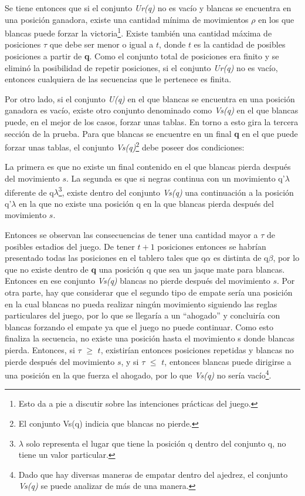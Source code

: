 \documentclass[twoside,openright,12pt,a4paper,spanish]{book}
\begin{document}
Se tiene entonces que si el conjunto \emph{Ur(q)} no es vacío y blancas se encuentra en una posición ganadora, existe una cantidad mínima de movimientos $\rho$ en los que blancas puede forzar la victoria\footnote{Esto da a pie a discutir sobre las intenciones prácticas del juego.}. Existe también una cantidad máxima de posiciones $\tau$ que debe ser menor o igual a $t$, donde $t$ es la cantidad de posibles posiciones a partir de \textbf{q}. Como el conjunto total de posiciones era finito y se eliminó la posibilidad de repetir posiciones, si el conjunto \emph{Ur(q)} no es vacío, entonces cualquiera de las secuencias que le pertenece es finita.

Por otro lado, si el conjunto \emph{U(q)} en el que blancas se encuentra en una posición ganadora es vacío, existe otro conjunto denominado como \emph{Vs(q)} en el que blancas puede, en el mejor de los casos, forzar unas tablas. En torno a esto gira la tercera sección de la prueba. Para que blancas se encuentre en un final \textbf{q} en el que puede forzar unas tablas, el conjunto \emph{Vs(q)}\footnote{El conjunto Vs(q) indicia que blancas no pierde.} debe poseer dos condiciones: 

La primera es que no existe un final contenido en el que blancas pierda después del movimiento $s$. La segunda es que si negras continua con un movimiento q’$\lambda$ diferente de q$\lambda$\footnote{$\lambda$ solo representa el lugar que tiene la posición q dentro del conjunto q, no tiene un valor particular.}, existe dentro del conjunto \emph{Vs(q)} una continuación a la posición q’$\lambda$ en la que no existe una posición q en la que blancas pierda después del movimiento $s$.

Entonces se observan las consecuencias de tener una cantidad mayor a $\tau$ de posibles estadios del juego. De tener $t + 1$ posiciones entonces se habrían presentado todas las posiciones en el tablero tales que q$\alpha$ es distinta de q$\beta$, por lo que no existe dentro de \textbf{q} una posición q que sea un jaque mate para blancas. Entonces en ese conjunto \emph{Vs(q)} blancas no pierde después del movimiento $s$. Por otra parte, hay que considerar que el segundo tipo de empate sería una posición en la cual blancas no pueda realizar ningún movimiento siguiendo las reglas particulares del juego, por lo que se llegaría a un “ahogado” y concluiría con blancas forzando el empate ya que el juego no puede continuar. Como esto finaliza la secuencia, no existe una posición hasta el movimiento s donde blancas pierda. Entonces, si $\tau$ $\geq$ $t$, existirían entonces posiciones repetidas y blancas no pierde después del movimiento $s$, y si $\tau$ $\leq$ $t$, entonces blancas puede dirigirse a una posición en la que fuerza el ahogado, por lo que \emph{Vs(q)} no sería vacío\footnote{Dado que hay diversas maneras de empatar dentro del ajedrez, el conjunto \emph{Vs(q)} se puede analizar de más de una manera.}.
\end{document}
